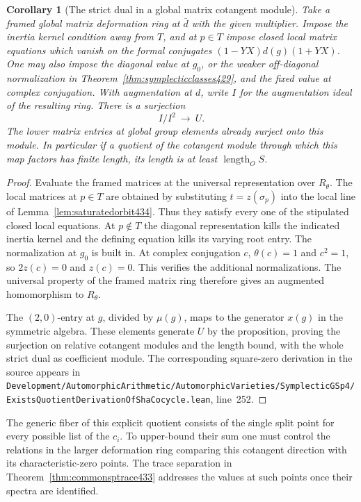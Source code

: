 \documentclass[a4paper,11pt]{article}
\newtheorem{corollary}[proposition]{Corollary}
\theoremstyle{definition}
\theoremstyle{remark}
\newcommand{\srcloc}[2]{{\small\nolinkurl{#1.lean}}, line~#2}
\numberwithin{equation}{section}
\begin{document}
\begin{corollary}[The strict dual in a global matrix cotangent module]\leavevmode
\label{cor:saturatedcotangent434}
Take a framed global matrix deformation ring at \(\bar d\)
with the given multiplier. Impose the inertia kernel condition
away from \(T\), and at \(p\in T\) impose closed local matrix
equations which vanish on the formal conjugates
\((1-YX)d(g)(1+YX)\). One may also impose the diagonal value
at \(g_0\), or the weaker off-diagonal normalization in
Theorem~\ref{thm:symplecticclasses429}, and the fixed value
at complex conjugation. With augmentation at \(d\), write
\(I\) for the augmentation ideal of the resulting ring.
There is a surjection
\[
                 I/I^2\ \longrightarrow\ U .
\]
The lower matrix entries at global group elements already
surject onto this module. In particular if a quotient of the
cotangent module through which this map factors has finite
length, its length is at least \(\operatorname{length}_O S\).
\end{corollary}
\begin{proof}
Evaluate the framed matrices at the universal representation
over \(R_\theta\). The local matrices at \(p\in T\) are obtained
by substituting \(t=z(\sigma_p)\) into the local line of
Lemma~\ref{lem:saturatedorbit434}. Thus they satisfy every
one of the stipulated closed local equations. At \(p\notin T\)
the diagonal representation kills the indicated inertia
kernel and the defining equation kills its varying root entry.
The normalization at \(g_0\) is built in. At complex conjugation
\(c\), \(\theta(c)=1\) and \(c^2=1\), so \(2z(c)=0\) and
\(z(c)=0\). This verifies the additional normalizations.
The universal property of the framed matrix ring therefore
gives an augmented homomorphism to \(R_\theta\).

The \((2,0)\)-entry at \(g\), divided by \(\mu(g)\), maps
to the generator \(x(g)\) in the symmetric algebra. These
elements generate \(U\) by the proposition, proving the
surjection on relative cotangent modules and the length
bound, with the whole strict dual as coefficient module.
The corresponding square-zero derivation in the source
appears in
\srcloc{Development/AutomorphicArithmetic/AutomorphicVarieties/SymplecticGSp4/ExistsQuotientDerivationOfShaCocycle}{252}.
\end{proof}

The generic fiber of this explicit quotient consists of the
single split point for every possible list of the \(c_i\).
To upper-bound their sum one must control the relations in
the larger deformation ring comparing this cotangent direction
with its characteristic-zero points. The trace separation in
Theorem~\ref{thm:commonsptrace433} addresses the values at such
points once their spectra are identified.
\end{document}

